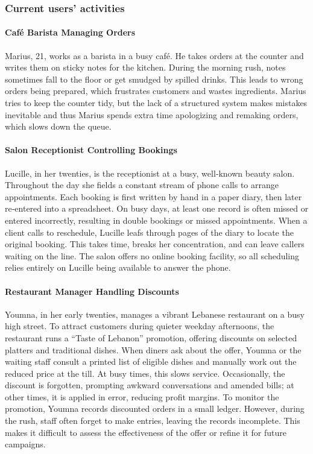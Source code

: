 \documentclass[]{VUMIFTemplateClass}
\newcommand{\subsubsubsection}[1]{\paragraph{#1}}
\begin{document}
\subsubsection{Current users' activities}

\subsubsubsection{Café Barista Managing Orders}

Marius, 21, works as a barista in a busy café. He takes orders at the counter
and writes them on sticky notes for the kitchen. During the morning rush, notes
sometimes fall to the floor or get smudged by spilled drinks. This leads to
wrong orders being prepared, which frustrates customers and wastes ingredients.
Marius tries to keep the counter tidy, but the lack of a structured system makes
mistakes inevitable and thus Marius spends extra time apologizing and remaking
orders, which slows down the queue.

\subsubsubsection{Salon Receptionist Controlling Bookings}

Lucille, in her twenties, is the receptionist at a busy, well‑known beauty
salon. Throughout the day she fields a constant stream of phone calls to arrange
appointments. Each booking is first written by hand in a paper diary, then later
re‑entered into a spreadsheet. On busy days, at least one record is often missed
or entered incorrectly, resulting in double bookings or missed appointments.
When a client calls to reschedule, Lucille leafs through pages of the diary to
locate the original booking. This takes time, breaks her concentration, and can
leave callers waiting on the line. The salon offers no online booking facility,
so all scheduling relies entirely on Lucille being available to answer the
phone.

\subsubsubsection{Restaurant Manager Handling Discounts}


Youmna, in her early twenties, manages a vibrant Lebanese restaurant on a busy
high street. To attract customers during quieter weekday afternoons, the
restaurant runs a “Taste of Lebanon” promotion, offering discounts on selected
platters and traditional dishes. When diners ask about the offer, Youmna or the
waiting staff consult a printed list of eligible dishes and manually work out
the reduced price at the till. At busy times, this slows service. Occasionally,
the discount is forgotten, prompting awkward conversations and amended bills; at
other times, it is applied in error, reducing profit margins. To monitor the
promotion, Youmna records discounted orders in a small ledger. However, during
the rush, staff often forget to make entries, leaving the records incomplete.
This makes it difficult to assess the effectiveness of the offer or refine it
for future campaigns.
\end{document}
